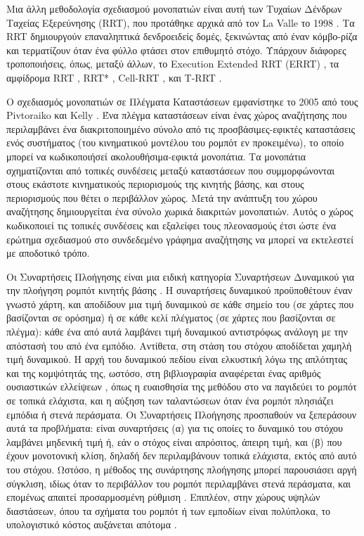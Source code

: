 Μια άλλη μεθοδολογία σχεδιασμού μονοπατιών είναι αυτή των Τυχαίων Δένδρων
Ταχείας Εξερεύνησης (RRT), που προτάθηκε αρχικά από τον La Valle το 1998
\cite{Lavalle1998}. Τα RRT δημιουργούν επαναληπτικά δενδροειδείς δομές,
ξεκινώντας από έναν κόμβο-ρίζα και τερματίζουν όταν ένα φύλλο φτάσει στον
επιθυμητό στόχο. Υπάρχουν διάφορες τροποποιήσεις, όπως, μεταξύ άλλων, το
Execution Extended RRT (ERRT) \cite{Bruce}, τα αμφίδρομα RRT \cite{Martin2007},
RRT* \cite{Karaman2010}, Cell-RRT \cite{Guitton2009}, και T-RRT
\cite{Jaillet2010}.

Ο σχεδιασμός μονοπατιών σε Πλέγματα Καταστάσεων εμφανίστηκε το 2005 από τους
Pivtoraiko και Kelly \cite{MikhailPivtoraiko2005}. Ένα πλέγμα καταστάσεων είναι
ένας χώρος αναζήτησης που περιλαμβάνει ένα διακριτοποιημένο σύνολο από τις
προσβάσιμες-εφικτές καταστάσεις ενός συστήματος (του κινηματικού μοντέλου του
ρομπότ εν προκειμένω), το οποίο μπορεί να κωδικοποιήσεί ακολουθήσιμα-εφικτά
μονοπάτια. Τα μονοπάτια σχηματίζονται από τοπικές συνδέσεις μεταξύ καταστάσεων
που συμμορφώνονται στους εκάστοτε κινηματικούς περιορισμούς της κινητής βάσης,
και στους περιορισμούς που θέτει ο περιβάλλον χώρος. Μετά την ανάπτυξη του χώρου
αναζήτησης δημιουργείται ένα σύνολο χωρικά διακριτών μονοπατιών. Αυτός ο χώρος
κωδικοποιεί τις τοπικές συνδέσεις και εξαλείφει τους πλεονασμούς έτσι ώστε ένα
ερώτημα σχεδιασμού στο συνδεδεμένο γράφημα αναζήτησης να μπορεί να εκτελεστεί
με αποδοτικό τρόπο.

Οι Συναρτήσεις Πλοήγησης είναι μια ειδική κατηγορία Συναρτήσεων Δυναμικού για
την πλοήγηση ρομπότ κινητής βάσης \cite{Latombe1991}. Η συναρτήσεις δυναμικού
προϋποθέτουν έναν γνωστό χάρτη, και αποδίδουν μια τιμή δυναμικού σε κάθε σημείο
του (σε χάρτες που βασίζονται σε ορόσημα) ή σε κάθε κελί πλέγματος (σε χάρτες
που βασίζονται σε πλέγμα): κάθε ένα από αυτά λαμβάνει τιμή δυναμικού αντιστρόφως
ανάλογη με την απόστασή του από ένα εμπόδιο. Αντίθετα, στη στάση του στόχου
αποδίδεται χαμηλή τιμή δυναμικού. Η αρχή του δυναμικού πεδίου είναι ελκυστική
λόγω της απλότητας και της κομψότητάς της, ωστόσο, στη βιβλιογραφία αναφέρεται
ένας αριθμός ουσιαστικών ελλείψεων \cite{Koren}\cite{Ge2000}, όπως η
ευαισθησία της μεθόδου στο να παγιδεύει το ρομπότ σε τοπικά ελάχιστα, και η
αύξηση των ταλαντώσεων όταν ένα ρομπότ πλησιάζει εμπόδια ή στενά περάσματα. Οι
Συναρτήσεις Πλοήγησης προσπαθούν να ξεπεράσουν αυτά τα προβλήματα: είναι
συναρτήσεις (α) για τις οποίες το δυναμικό του στόχου λαμβάνει μηδενική τιμή ή,
εάν ο στόχος είναι απρόσιτος, άπειρη τιμή, και (β) που έχουν μονοτονική κλίση,
δηλαδή δεν περιλαμβάνουν τοπικά ελάχιστα, εκτός από αυτό του στόχου. Ωστόσο, η
μέθοδος της συνάρτησης πλοήγησης μπορεί παρουσιάσει αργή σύγκλιση, ιδίως όταν
το περιβάλλον του ρομπότ περιλαμβάνει στενά περάσματα, και επομένως απαιτεί
προσαρμοσμένη ρύθμιση \cite{Kowalczyk2019}. Επιπλέον, στην χώρους υψηλών
διαστάσεων, όπου τα σχήματα του ρομπότ ή των εμποδίων είναι πολύπλοκα, το
υπολογιστικό κόστος αυξάνεται απότομα \cite{Park2016}.

